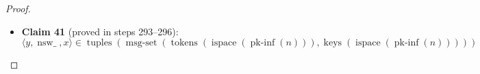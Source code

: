 \documentclass[11pt]{article}
\theoremstyle{plain}
\begin{document}
\begin{proof}
\begin{itemize}[leftmargin=2.8em, itemsep=4pt, parsep=1pt]
\begin{itemize}[leftmargin=2.8em, itemsep=4pt, parsep=1pt]
\begin{equation*}
\begin{array}{@{}l@{}}
\wedge \\ \quad \quad \quad \exists u. \\ \quad \quad \quad \quad \operatorname{same\text{-}strand\text{-}before}(\operatorname{ispace}(\mathit{isp}), u, m) \wedge (\operatorname{node\text{-}content}(\operatorname{ispace}(\mathit{isp}), u) = h) \end{array} \\
\operatorname{is\text{-}adversary\text{-}node}(\operatorname{pk\text{-}inf}(n), m) \\
\begin{array}{@{}l@{}} \operatorname{is\text{-}subterm}(\operatorname{tokens}(\operatorname{ispace}(\operatorname{pk\text{-}inf}(n))), \operatorname{keys}(\operatorname{ispace}(\operatorname{pk\text{-}inf}(n))), \\ \quad \operatorname{encr}(\operatorname{lst}(\langle y, \operatorname{nsw\_}, x \rangle), \operatorname{pubkey}(n)(p)), \\ \quad \operatorname{node\text{-}content}(\operatorname{ispace}(\operatorname{pk\text{-}inf}(n)), u_{2})) \end{array} \\
\operatorname{nsw\_} \in \operatorname{tokens}(\operatorname{ispace}(\operatorname{pk\text{-}inf}(n)))
\end{array}
\end{equation*}
Clearly $\operatorname{nsw\_} \in \operatorname{msg\text{-}set}(\operatorname{tokens}(\operatorname{ispace}(\operatorname{pk\text{-}inf}(n))), \operatorname{keys}(\operatorname{ispace}(\operatorname{pk\text{-}inf}(n))))$.
  \item[\textbf{292}] \textbf{Claim 41} (proved in steps 293--296):
\begin{equation*}
\langle y, \operatorname{nsw\_}, x \rangle \in \operatorname{tuples}(\operatorname{msg\text{-}set}(\operatorname{tokens}(\operatorname{ispace}(\operatorname{pk\text{-}inf}(n))), \operatorname{keys}(\operatorname{ispace}(\operatorname{pk\text{-}inf}(n)))))
\end{equation*}


\end{itemize}
\end{itemize}
\end{proof}
\end{document}
